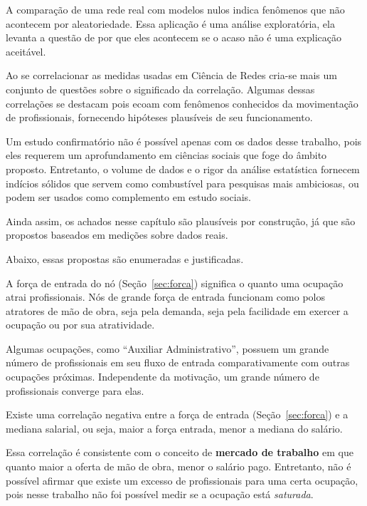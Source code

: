 \documentclass[12pt,a4paper,final]{article}
\begin{document}
A comparação de uma rede real com modelos nulos indica fenômenos que não acontecem por aleatoriedade. Essa aplicação é uma análise exploratória, ela levanta a questão de por que eles acontecem se o acaso não é uma explicação aceitável.

Ao se correlacionar as medidas usadas em Ciência de Redes cria-se mais um conjunto de questões sobre o significado da correlação. Algumas dessas correlações se destacam pois ecoam com fenômenos conhecidos da movimentação de profissionais, fornecendo hipóteses plausíveis de seu funcionamento.

Um estudo confirmatório não é possível apenas com os dados desse trabalho, pois eles requerem um aprofundamento em ciências sociais que foge do âmbito proposto. Entretanto, o volume de dados e o rigor da análise estatística fornecem indícios sólidos que servem como combustível para pesquisas mais ambiciosas, ou podem ser usados como complemento em estudo sociais.

Ainda assim, os achados nesse capítulo são plausíveis por construção, já que são propostos baseados em medições sobre dados reais.

Abaixo, essas propostas são enumeradas e justificadas.

\begin{hypothesis}
    A força de entrada do nó (Seção~\ref{sec:forca}) significa o quanto uma ocupação atrai profissionais. Nós de grande força de entrada funcionam como polos atratores de mão de obra, seja pela demanda, seja pela facilidade em exercer a ocupação ou por sua atratividade.
\end{hypothesis}

Algumas ocupações, como \enquote{Auxiliar Administrativo}, possuem um grande número de profissionais em seu fluxo de entrada comparativamente com outras ocupações próximas. Independente da motivação, um grande número de profissionais converge para elas.

\begin{hypothesis}
    Existe uma correlação negativa entre a força de entrada (Seção~\ref{sec:forca}) e a mediana salarial, ou seja, maior a força entrada, menor a mediana do salário.
\end{hypothesis}


Essa correlação é consistente com o conceito de \textbf{mercado de trabalho} em que quanto maior a oferta de mão de obra, menor o salário pago. Entretanto, não é possível afirmar que existe um excesso de profissionais para uma certa ocupação, pois nesse trabalho não foi possível medir se a ocupação está \textit{saturada}.
\end{document}
